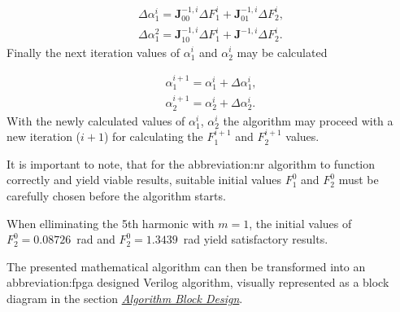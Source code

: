 \documentclass[a4paper, twoside, 11pt]{article}
\begin{document}
        \begin{equation}
            \begin{gathered}
                \Delta \alpha_1^i = \textbf{J}_{00}^{-1,i} \Delta F_1^i + \textbf{J}_{01}^{-1,i} \Delta F_2^i,\\
                \Delta \alpha_1^2 = \textbf{J}_{10}^{-1,i} \Delta F_1^i + \textbf{J}^{-1,i} \Delta F_2^i.
            \end{gathered}
        \end{equation}
        Finally the next iteration values of $\alpha_1^i$ and $\alpha_2^i$ may be calculated

        \begin{equation}
            \begin{gathered}
                \alpha_1^{i+1} = \alpha_1^i + \Delta \alpha_1^i,\\
                \alpha_2^{i+1} = \alpha_2^i + \Delta \alpha_2^i.
            \end{gathered}
        \end{equation}
        With the newly calculated values of $\alpha_1^i$, $\alpha_2^i$ the algorithm may proceed with a new iteration ($i+1$) for calculating the $F_1^{i+1}$ and $F_2^{i+1}$ values.\par
        It is important to note, that for the \gls{abbreviation:nr} algorithm to function correctly and yield viable results, suitable initial values $F_1^0$ and $F_2^0$ must be carefully chosen before the algorithm starts.\par
        When elliminating the 5th harmonic with $m = 1$, the initial values of $F_2^0 = 0.08726$~rad and $F_2^0 = 1.3439$~rad yield satisfactory results.\par
        The presented mathematical algorithm can then be transformed into an \gls{abbreviation:fpga} designed Verilog algorithm, visually represented as a block diagram in the section \hyperref[subsubsec:algorithm-block-design]{\textit{Algorithm Block Design}}.
\end{document}
